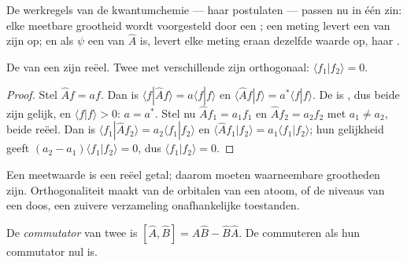 De werkregels van de kwantumchemie --- haar postulaten --- passen nu in
één zin: elke meetbare grootheid wordt voorgesteld door een ; een meting levert een van zijn  op; en als
$\psi$ een  van $\hat A$ is, levert elke meting eraan dezelfde
waarde op, haar .

\begin{theorem}\label{thm:b3:quantum-model-systems:hermitian-real}
De  van een  zijn reëel. Twee
 met verschillende  zijn orthogonaal:
$\langle f_1|f_2\rangle = 0$.
\end{theorem}

\begin{proof}
Stel $\hat Af = af$. Dan is $\langle f|\hat Af\rangle = a\langle f|f\rangle$ en
$\langle\hat Af|f\rangle = a^*\langle f|f\rangle$. De  is ,
dus beide zijn gelijk, en $\langle f|f\rangle > 0$: $a = a^*$. Stel nu $\hat Af_1
= a_1f_1$ en $\hat Af_2 = a_2f_2$ met $a_1 \ne a_2$, beide reëel. Dan is
$\langle f_1|\hat Af_2\rangle = a_2\langle f_1|f_2\rangle$ en $\langle\hat Af_1|
f_2\rangle = a_1\langle f_1|f_2\rangle$; hun gelijkheid geeft $(a_2 - a_1)
\langle f_1|f_2\rangle = 0$, dus $\langle f_1|f_2\rangle = 0$.
\end{proof}

Een meetwaarde is een reëel getal; daarom moeten waarneembare grootheden
 zijn. Orthogonaliteit maakt van de orbitalen van een atoom, of
de niveaus van een doos, een zuivere verzameling onafhankelijke
toestanden.

\begin{definition}[Commutator]\label{def:b3:quantum-model-systems:commutator}
De \emph{commutator} van twee  is $[\hat A,\hat B] =
\hat A\hat B - \hat B\hat A$. De  commuteren als hun commutator
nul is.
\end{definition}

